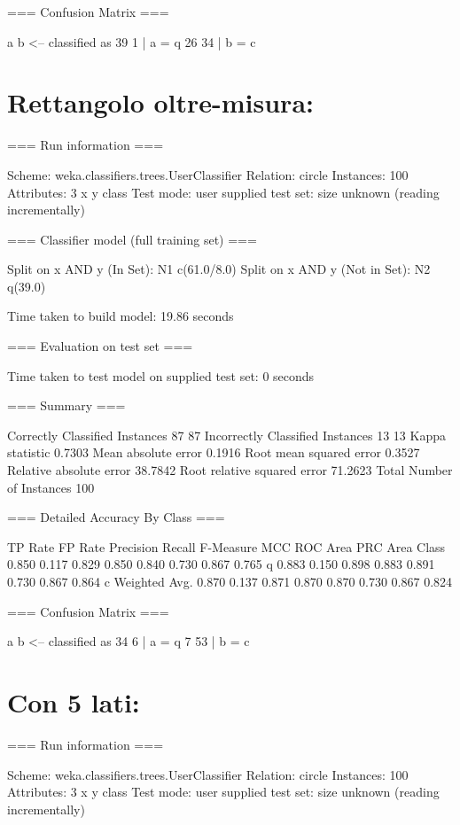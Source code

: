 \documentclass{report}
\begin{document}
	=== Confusion Matrix ===
	
	a  b   <-- classified as
	39  1 |  a = q
	26 34 |  b = c
	
	\section{Rettangolo oltre-misura:}
	=== Run information ===
	
	Scheme:       weka.classifiers.trees.UserClassifier 
	Relation:     circle
	Instances:    100
	Attributes:   3
	x
	y
	class
	Test mode:    user supplied test set:  size unknown (reading incrementally)
	
	=== Classifier model (full training set) ===
	
	
	Split on x AND y (In Set): N1 c(61.0/8.0)
	Split on x AND y (Not in Set): N2 q(39.0)
	
	Time taken to build model: 19.86 seconds
	
	=== Evaluation on test set ===
	
	Time taken to test model on supplied test set: 0 seconds
	
	=== Summary ===
	
	Correctly Classified Instances          87               87      %
	Incorrectly Classified Instances        13               13      %
	Kappa statistic                          0.7303
	Mean absolute error                      0.1916
	Root mean squared error                  0.3527
	Relative absolute error                 38.7842 %
	Root relative squared error             71.2623 %
	Total Number of Instances              100     
	
	=== Detailed Accuracy By Class ===
	
	TP Rate  FP Rate  Precision  Recall   F-Measure  MCC      ROC Area  PRC Area  Class
	0.850    0.117    0.829      0.850    0.840      0.730    0.867     0.765     q
	0.883    0.150    0.898      0.883    0.891      0.730    0.867     0.864     c
	Weighted Avg.    0.870    0.137    0.871      0.870    0.870      0.730    0.867     0.824     
	
	=== Confusion Matrix ===
	
	a  b   <-- classified as
	34  6 |  a = q
	7 53 |  b = c
	
	\section{Con 5 lati:}
	=== Run information ===
	
	Scheme:       weka.classifiers.trees.UserClassifier 
	Relation:     circle
	Instances:    100
	Attributes:   3
	x
	y
	class
	Test mode:    user supplied test set:  size unknown (reading incrementally)
	
\end{document}
